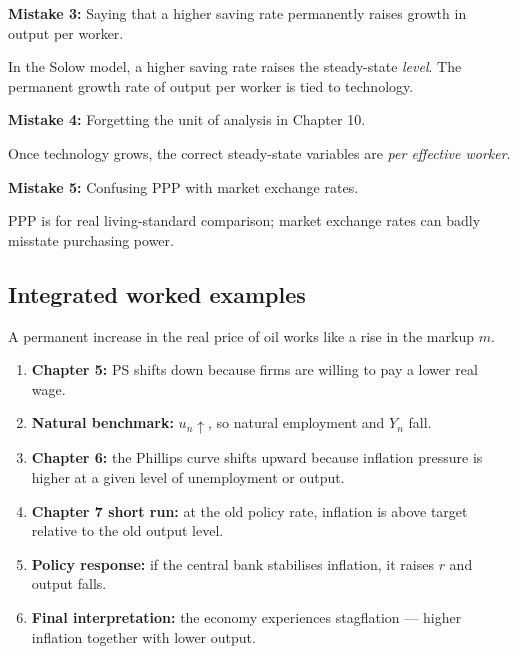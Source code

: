 \documentclass[12pt]{article}
\begin{document}
\begin{commonmistake}
\textbf{Mistake 3:} Saying that a higher saving rate permanently raises growth in output per worker.

In the Solow model, a higher saving rate raises the steady-state \emph{level}. The permanent growth rate of output per worker is tied to technology.
\end{commonmistake}

\begin{commonmistake}
\textbf{Mistake 4:} Forgetting the unit of analysis in Chapter 10.

Once technology grows, the correct steady-state variables are \emph{per effective worker}.
\end{commonmistake}

\begin{commonmistake}
\textbf{Mistake 5:} Confusing PPP with market exchange rates.

PPP is for real living-standard comparison; market exchange rates can badly misstate purchasing power.
\end{commonmistake}

\subsection{Integrated worked examples}

\begin{examplebox}[title={Worked Example: Permanent oil-price increase across Chapters 5--7}]
A permanent increase in the real price of oil works like a rise in the markup \(m\).

\begin{enumerate}[leftmargin=1.5em]
\item \textbf{Chapter 5:} PS shifts down because firms are willing to pay a lower real wage.
\item \textbf{Natural benchmark:} \(u_n\uparrow\), so natural employment and \(Y_n\) fall.
\item \textbf{Chapter 6:} the Phillips curve shifts upward because inflation pressure is higher at a given level of unemployment or output.
\item \textbf{Chapter 7 short run:} at the old policy rate, inflation is above target relative to the old output level.
\item \textbf{Policy response:} if the central bank stabilises inflation, it raises \(r\) and output falls.
\item \textbf{Final interpretation:} the economy experiences stagflation --- higher inflation together with lower output.
\end{enumerate}
\end{examplebox}
\end{document}
